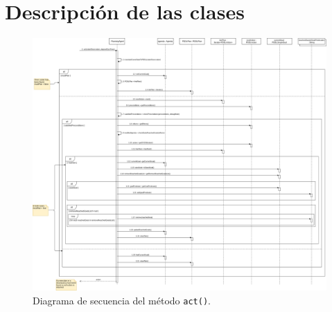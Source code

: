 \section{Descripción de las clases}

\begin{figure}[H]
    \centering
    \includegraphics[scale=0.22]{img/CH07/sequence_diagram.png}
    \caption{Diagrama de secuencia del método \texttt{act()}.}
    \label{fig:sequence_diagram}
\end{figure}